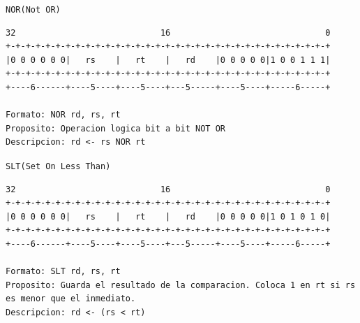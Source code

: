 \texttt{NOR(Not OR)}

\begin{lstlisting}[style=consola]
32                             16                               0
+-+-+-+-+-+-+-+-+-+-+-+-+-+-+-+-+-+-+-+-+-+-+-+-+-+-+-+-+-+-+-+-+
|0 0 0 0 0 0|   rs    |   rt    |   rd    |0 0 0 0 0|1 0 0 1 1 1|
+-+-+-+-+-+-+-+-+-+-+-+-+-+-+-+-+-+-+-+-+-+-+-+-+-+-+-+-+-+-+-+-+
+----6------+----5----+----5----+---5-----+----5----+-----6-----+

Formato: NOR rd, rs, rt
Proposito: Operacion logica bit a bit NOT OR
Descripcion: rd <- rs NOR rt
\end{lstlisting}

\texttt{SLT(Set On Less Than)}

\begin{lstlisting}[style=consola]
32                             16                               0
+-+-+-+-+-+-+-+-+-+-+-+-+-+-+-+-+-+-+-+-+-+-+-+-+-+-+-+-+-+-+-+-+
|0 0 0 0 0 0|   rs    |   rt    |   rd    |0 0 0 0 0|1 0 1 0 1 0|
+-+-+-+-+-+-+-+-+-+-+-+-+-+-+-+-+-+-+-+-+-+-+-+-+-+-+-+-+-+-+-+-+
+----6------+----5----+----5----+---5-----+----5----+-----6-----+

Formato: SLT rd, rs, rt
Proposito: Guarda el resultado de la comparacion. Coloca 1 en rt si rs es menor que el inmediato.
Descripcion: rd <- (rs < rt)
\end{lstlisting}